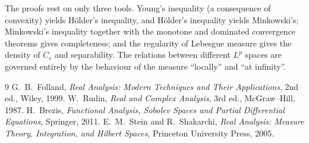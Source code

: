 \documentclass[11pt]{article}
\begin{document}
The proofs rest on only three tools. Young's inequality (a consequence of convexity) yields Hölder's inequality, and Hölder's inequality yields Minkowski's; Minkowski's inequality together with the monotone and dominated convergence theorems gives completeness; and the regularity of Lebesgue measure gives the density of $C_{c}$ and separability. The relations between different $L^{p}$ spaces are governed entirely by the behaviour of the measure ``locally'' and ``at infinity''.

\begin{thebibliography}{9}
 G.~B.~Folland, \emph{Real Analysis: Modern Techniques and Their Applications}, 2nd ed., Wiley, 1999.
 W.~Rudin, \emph{Real and Complex Analysis}, 3rd ed., McGraw--Hill, 1987.
 H.~Brezis, \emph{Functional Analysis, Sobolev Spaces and Partial Differential Equations}, Springer, 2011.
 E.~M.~Stein and R.~Shakarchi, \emph{Real Analysis: Measure Theory, Integration, and Hilbert Spaces}, Princeton University Press, 2005.
\end{thebibliography}
\end{document}
